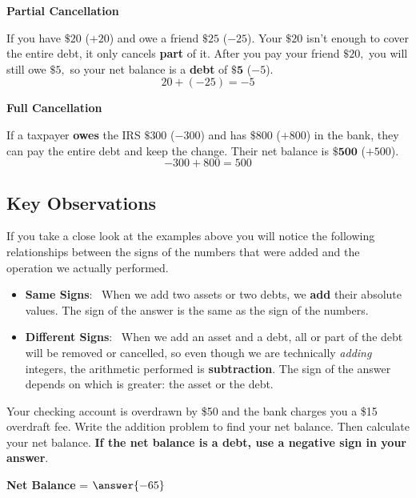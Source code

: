 \documentclass{ximera}[font=12pt]
\begin{document}
\begin{example} \textcolor{accessibleOrange}{\textbf{Partial Cancellation}}  
    
    If you have $\$20$ ($+20$) and owe a friend $\$25$ ($-25$).  Your $\$20$ isn't enough to 
    cover the entire debt, it only cancels \textbf{part} of it.  After you pay your friend $\$20,$ you will still owe $\$5,$ so
    your net balance is a \textbf{debt} of $\mathbf{\$5}$ ($-5$).
    \[ 20 + (-25) = -5 \]
\end{example}

\begin{example} \textcolor{accessibleOrange}{\textbf{Full Cancellation}} 
    
    If a taxpayer \textbf{owes} the IRS $\$300$ ($-300$) and has $\$800$ ($+800$) in the bank, they can pay the 
    entire debt and keep the change.  Their net balance is $\mathbf{\$500}$ ($+500$).
    \[ -300 + 800 = 500 \]
\end{example}


\subsection*{Key Observations}

If you take a close look at the examples above you will notice the following relationships between the signs of the numbers that were added and the 
operation we actually performed.


\begin{itemize}
    \item[] \textbf{Same Signs}: \ When we add two assets or two debts, we \textbf{add} their absolute values.  The sign of 
    the answer is the same as the sign of the numbers.

    \item[] \textbf{Different Signs}: \  When we add an asset and a debt, all or part of the debt will be removed or cancelled, 
    so even though we are technically \emph{adding} integers, the arithmetic performed is \textbf{subtraction}.  The sign of 
    the answer depends on which is greater: the asset or the debt.
\end{itemize}



\begin{problem}
Your checking account is overdrawn by \$50 and the bank charges you a \$15 overdraft fee.  Write the addition problem to find your 
net balance.  Then calculate your net balance.  \textbf{If the net balance is a debt, use a negative sign in your answer}. 


\begin{multipleChoice}
\end{multipleChoice}


\textcolor{accessibleOrange}{\textbf{Net Balance}} = $\answer{-65}$

\end{problem}
\end{document}
